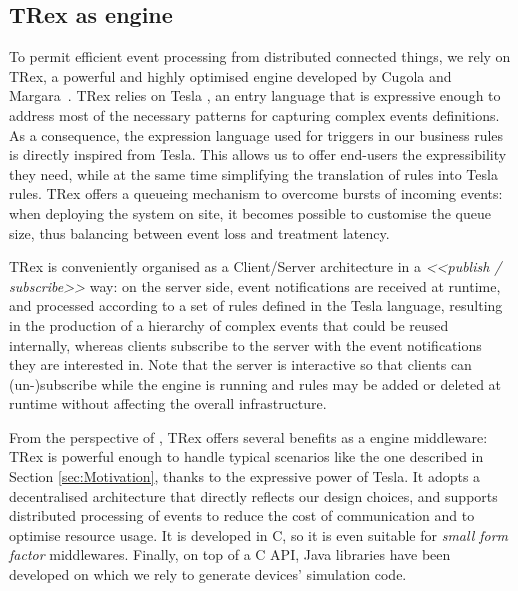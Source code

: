 \subsection{TRex as \CEP engine}
\label{sec:CG-TRex}

To permit efficient event processing from distributed connected things, we rely on TRex, a powerful and highly optimised \CEP engine developed by Cugola and Margara~\cite{cugola-12}. TRex relies on Tesla \cite{Cugola-Margara:2010}, an entry language that is expressive enough to address most of the necessary patterns for capturing complex events definitions. As a consequence, the expression language used for triggers in our business rules is directly inspired from Tesla. This allows us to offer end-users the expressibility they need, while at the same time simplifying the translation of \IOTDSL rules into Tesla rules. TRex offers a queueing mechanism to overcome bursts of incoming events: when deploying the \IOT system on site, it becomes possible to customise the queue size, thus balancing between event loss and treatment latency. 

TRex is conveniently organised as a Client/Server architecture in a \textit{<<publish / subscribe>>} way: on the server side, event notifications are received at runtime, and processed according to a set of rules defined in the Tesla language, resulting in the production of a hierarchy of complex events that could be reused internally, whereas clients subscribe to the server with the event notifications they are interested in. Note that the server is interactive so that clients can (un-)subscribe while the engine is running and rules may be added or deleted at runtime without affecting the overall infrastructure. 

From the perspective of \IOTDSL, TRex offers several benefits as a \CEP engine middleware: TRex is powerful enough to handle typical \IOT scenarios like the one described in Section \ref{sec:Motivation}, thanks to the expressive power of Tesla. It adopts a decentralised architecture that directly reflects our design choices, and supports distributed processing of events to reduce the cost of communication and to optimise resource usage. It is developed in C, so it is even suitable for \textit{small form factor} middlewares. Finally, on top of a C \textsc{API}, Java libraries have been developed on which we rely to generate devices' simulation code.
